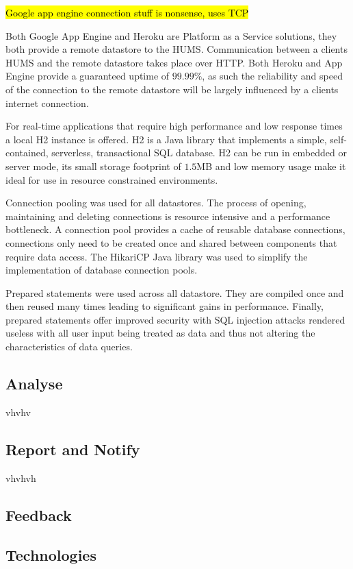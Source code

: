 \documentclass[10pt,a4paper]{article}
\begin{document}
\hl{Google app engine connection stuff is nonsense, uses TCP}

Both Google App Engine and Heroku are Platform as a Service solutions, they both provide a remote datastore to the HUMS. Communication between a clients HUMS and the remote datastore takes place over HTTP. Both Heroku and App Engine provide a guaranteed uptime of $99.99\%$, as such the reliability and speed of the connection to the remote datastore will be largely influenced by a clients internet connection.

For real-time applications that require high performance and low response times a local H2 instance is offered. H2 is a Java library that implements a simple, self-contained, serverless, transactional SQL database. H2 can be run in embedded or server mode, its small storage footprint of $1.5$MB and low memory usage make it ideal for use in resource constrained environments. 

Connection pooling was used for all datastores. The process of opening, maintaining and deleting connections is resource intensive and a performance bottleneck. A connection pool provides a cache of reusable database connections, connections only need to be created once and shared between components that require data access. The HikariCP Java library was used to simplify the implementation of database connection pools. 

Prepared statements were used across all datastore. They are compiled once and then reused many times leading to significant gains in performance. Finally, prepared statements offer improved security with SQL injection attacks rendered useless with all user input being treated as data and thus not altering the characteristics of data queries.

\subsection{Analyse}
\label{sec:analyse}
vhvhv

\subsection{Report and Notify}
\label{sec:report}
vhvhvh

\subsection{Feedback}
\label{sec:feedback}

\subsection{Technologies}
\end{document}
